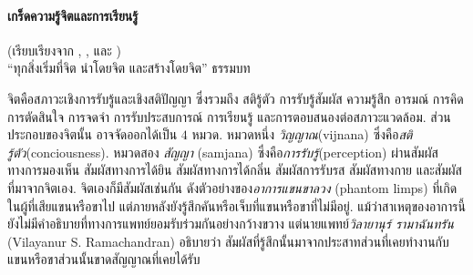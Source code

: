 {\small
\begin{shaded}
\paragraph{\small เกร็ดความรู้จิตและการเรียนรู้}
(เรียบเรียงจาก \cite{Wikipedia}, \cite{AccessInsight}, และ \cite{Poo2010a})\\
``ทุกสิ่งเริ่มที่จิต นำโดยจิต และสร้างโดยจิต'' ธรรมบท\cite{AccessInsight}\\

จิตคือสภาวะเชิงการรับรู้และเชิงสติปัญญา ซึ่งรวมถึง 
สติรู้ตัว
การรับรู้สัมผัส  
ความรู้สึก อารมณ์ 
การคิด การตัดสินใจ การจดจำ การรับประสบการณ์ การเรียนรู้ และการตอบสนองต่อสภาวะแวดล้อม.
ส่วนประกอบของจิตนั้น อาจจัดออกได้เป็น $4$ หมวด.
%
หมวดหนึ่ง %
\textit{วิญญาณ}(vijnana) ซึ่งคือ\textit{สติรู้ตัว}(conciousness).
หมวดสอง %
\textit{สัญญา} (samjana) ซึ่งคือ\textit{การรับรู้}(perception) ผ่านสัมผัสทางการมองเห็น สัมผัสทางการได้ยิน สัมผัสทางการได้กลิ่น
สัมผัสการรับรส สัมผัสทางกาย และสัมผัสที่มาจากจิตเอง.
จิตเองก็มีสัมผัสเช่นกัน ดังตัวอย่างของ\textit{อาการแขนขาลวง} (phantom limps) ที่เกิดในผู้ที่เสียแขนหรือขาไป แต่ภายหลังยังรู้สึกคันหรือเจ็บที่แขนหรือขาที่ไม่มีอยู่.
แม้ว่าสาเหตุของอาการนี้ยังไม่มีคำอธิบายที่ทางการแพทย์ยอมรับร่วมกันอย่างกว้างขวาง
แต่นายแพทย์\textit{วิลายานุร์ รามาฉันทรัน} (Vilayanur S. Ramachandran)
อธิบายว่า สัมผัสที่รู้สึกนั้นมาจากประสาทส่วนที่เคยทำงานกับแขนหรือขาส่วนนั้นขาดสัญญาณที่เคยได้รับ

\end{shaded}}
